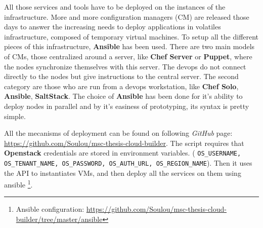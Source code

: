 All those services and tools have to be deployed on the instances of the
infrastructure.  More and more configuration managers (CM) are released those days to
answer the increasing needs to deploy applications in volatiles infrastructure,
composed of temporary virtual machines. To setup all the different pieces of
this infrastructure, \textbf{Ansible} has been used. There are two main models
of CMs, those centralized around a server, like \textbf{Chef Server} or \textbf{Puppet},
where the nodes synchronize themselves with this server. The devops do not connect
directly to the nodes but give instructions to the central server. The second
category are those who are run from a devops workstation, like \textbf{Chef Solo},
\textbf{Ansible}, \textbf{SaltStack}. The choice of \textbf{Ansible} has been done
for it's ability to deploy nodes in parallel and by it's easiness of prototyping,
its syntax is pretty simple.

All the mecanisms of deployment can be found on following \textit{GitHub} page:
\url{https://github.com/Soulou/msc-thesis-cloud-builder}. The script requires
that \textbf{Openstack} credentials are stored in environment variables. (
\texttt{OS\_USERNAME, OS\_TENANT\_NAME, OS\_PASSWORD, OS\_AUTH\_URL,
OS\_REGION\_NAME}). Then it uses the API to instantiates VMs, and then deploy
all the services on them using ansible \footnote{Ansible configuration:
\url{https://github.com/Soulou/msc-thesis-cloud-builder/tree/master/ansible}}.

